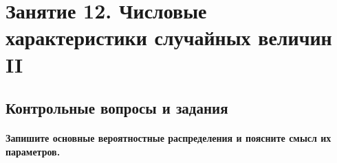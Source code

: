 \chapter*{Занятие 12. Числовые характеристики случайных величин II}

\section*{Контрольные вопросы и задания}

\subsubsection*{Запишите основные вероятностные распределения и поясните смысл их параметров.}

